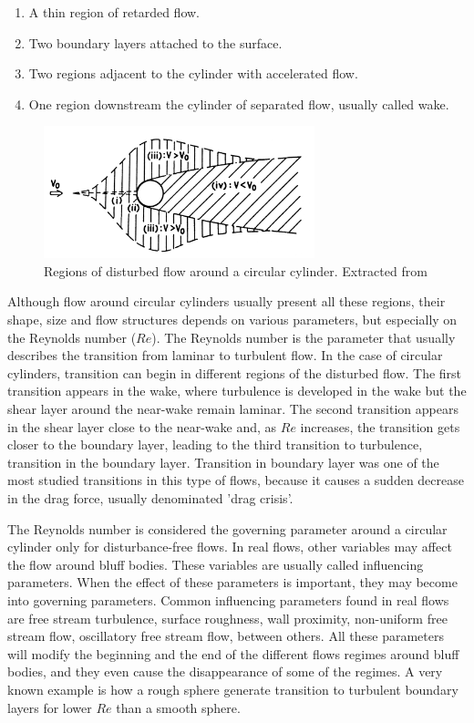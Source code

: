 \documentclass[journal]{new-aiaa}
\begin{document}
\begin{enumerate}[label=(\roman*)]
\item A thin region of retarded flow.
\item Two boundary layers attached to the surface.
\item Two regions adjacent to the cylinder with accelerated flow.
\item One region downstream the cylinder of separated flow, usually called wake.
\end{enumerate}

\begin{figure}[H]
\begin{center}
\includegraphics[width=0.7\textwidth]{Images/federico/Figure01}
\caption{ Regions of disturbed flow around a circular cylinder. Extracted from \cite{Zdravkovich1997} }
\label{fig:RegionsFlow}
\end{center}
\end{figure}

Although flow around circular cylinders usually present all these regions, their shape, size and flow structures depends on various parameters, but especially on the Reynolds number ($Re$). The Reynolds number is the parameter that usually describes the transition from laminar to turbulent flow. In the case of circular cylinders, transition can begin in different regions of the disturbed flow. The first transition appears in the wake, where turbulence is developed in the wake but the shear layer around the near-wake remain laminar. The second transition appears in the shear layer close to the near-wake and, as $Re$ increases, the transition gets closer to the boundary layer, leading to the third transition to turbulence, transition in the boundary layer. Transition in boundary layer was one of the most studied transitions in this type of flows, because it causes a sudden decrease in the drag force, usually denominated 'drag crisis'.

The Reynolds number is considered the governing parameter around a circular cylinder only for disturbance-free flows. In real flows, other variables may affect the flow around bluff bodies. These variables are usually called influencing parameters. When the effect of these parameters is important, they may become into governing parameters. Common influencing parameters found in real flows are free stream turbulence, surface roughness, wall proximity, non-uniform free stream flow, oscillatory free stream flow, between others. All these parameters will modify the beginning and the end of the different flows regimes around bluff bodies, and they even cause the disappearance of some of the regimes. A very known example is how a rough sphere generate transition to turbulent boundary layers for lower $Re$ than a smooth sphere.
\end{document}
